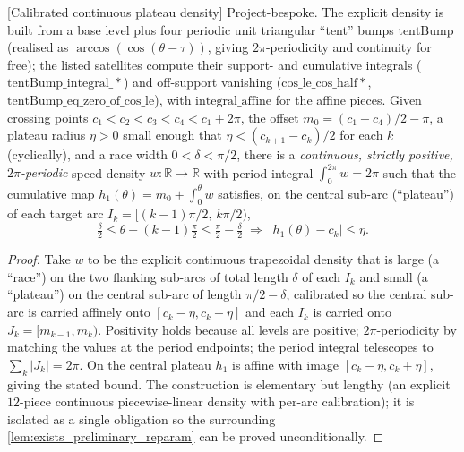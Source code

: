 \begin{lemma}

[Calibrated continuous plateau density]
  \label{lem:plateau_density}
  Project-bespoke. The explicit density is built from a base level plus four
  periodic unit triangular ``tent'' bumps $\mathrm{tentBump}$ (realised as
  $\arccos(\cos(\theta-\tau))$, giving $2\pi$-periodicity and continuity for free);
  the listed satellites compute their support- and cumulative integrals
  ($\mathrm{tentBump\_integral\_\ast}$) and off-support vanishing
  ($\mathrm{cos\_le\_cos\_half\ast}$, $\mathrm{tentBump\_eq\_zero\_of\_cos\_le}$),
  with $\mathrm{integral\_affine}$ for the affine pieces.
  Given crossing points $c_1<c_2<c_3<c_4<c_1+2\pi$, the offset
  $m_0=(c_1+c_4)/2-\pi$, a plateau radius $\eta>0$ small enough that
  $\eta<(c_{k+1}-c_k)/2$ for each $k$ (cyclically), and a race width $0<\delta<\pi/2$,
  there is a \emph{continuous, strictly positive, $2\pi$-periodic} speed density
  $w:\mathbb{R}\to\mathbb{R}$ with period integral $\int_0^{2\pi} w = 2\pi$ such
  that the cumulative map $h_1(\theta)=m_0+\int_0^\theta w$ satisfies, on the
  central sub-arc (``plateau'') of each target arc $I_k=[(k-1)\pi/2,\,k\pi/2)$,
  \[
    \tfrac{\delta}{2}\le\theta-(k-1)\tfrac{\pi}{2}\le\tfrac{\pi}{2}-\tfrac{\delta}{2}
    \;\Longrightarrow\; \bigl\lvert h_1(\theta)-c_k\bigr\rvert\le\eta .
  \]
\end{lemma}
\begin{proof}
  Take $w$ to be the explicit continuous trapezoidal density that is large (a
  ``race'') on the two flanking sub-arcs of total length $\delta$ of each $I_k$
  and small (a ``plateau'') on the central sub-arc of length $\pi/2-\delta$,
  calibrated so the central sub-arc is carried affinely onto $[c_k-\eta,c_k+\eta]$
  and each $I_k$ is carried onto $J_k=[m_{k-1},m_k)$. Positivity holds because all
  levels are positive; $2\pi$-periodicity by matching the values at the period
  endpoints; the period integral telescopes to $\sum_k\lvert J_k\rvert=2\pi$. On
  the central plateau $h_1$ is affine with image $[c_k-\eta,c_k+\eta]$, giving the
  stated bound. The construction is elementary but lengthy (an explicit $12$-piece
  continuous piecewise-linear density with per-arc calibration); it is isolated as
  a single obligation so the surrounding \cref{lem:exists_preliminary_reparam} can
  be proved unconditionally.
\end{proof}

